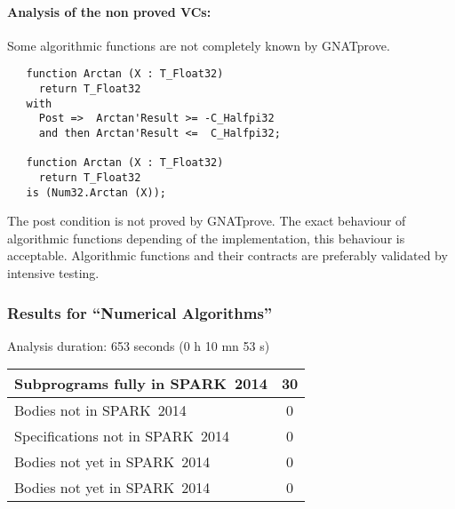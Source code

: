 \documentclass[10pt,a4paper,twocolumn]{article}
\newcommand{\gnatprove}{GNATprove\xspace}
\newcommand{\newspark}{SPARK~2014\xspace}
\begin{document}
\paragraph{Analysis of the non proved VCs:}
Some algorithmic functions are not completely known by \gnatprove.

\begin{lstlisting}
   function Arctan (X : T_Float32) 
	 return T_Float32
   with
     Post =>  Arctan'Result >= -C_Halfpi32
     and then Arctan'Result <=  C_Halfpi32;

   function Arctan (X : T_Float32) 
	 return T_Float32
   is (Num32.Arctan (X));
\end{lstlisting}

The post condition is not proved by \gnatprove.
The exact behaviour of algorithmic functions depending of the implementation, this behaviour is acceptable.
Algorithmic functions and their contracts are preferably validated by intensive testing.

\subsubsection{Results for ``Numerical Algorithms''}

Analysis duration: 653 seconds (0 h 10 mn 53 s)

\vspace{5mm}

\begin{tabular}{|l|c|}
\hline
Subprograms fully in \newspark  & 30  \\
\hline
Bodies not in \newspark         & 0   \\
\hline
Specifications not in \newspark & 0   \\
\hline
Bodies not yet in \newspark     & 0   \\
\hline
Bodies not yet in \newspark     & 0   \\
\hline
\end{tabular}

\vspace{5mm}
\end{document}
